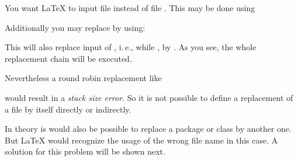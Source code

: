 \begin{Example}
  You want \LaTeX{} to input file  instead of file
  . This may be done using
\begin{lstcode}
\end{lstcode}
  Additionally you may replace  by
   using:
\begin{lstcode}
\end{lstcode}
  This will also replace input of , i.\,e., while
  , by . As you see,
  the whole replacement chain will be executed.

  Nevertheless a round robin replacement like
\begin{lstcode}
\end{lstcode}
  would result in a \emph{stack size error}. So it is not possible to define a
  replacement of a file by itself directly or indirectly.
\end{Example}

In theory is would also be possible to replace a package or class by another
one. But \LaTeX{} would recognize the usage of the wrong file name in this
case. A solution for this problem will be shown next.%
%
%

